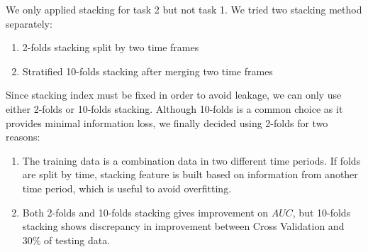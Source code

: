 \documentclass[a4paper]{llncs}
\begin{document}
%
%
%
%
%
%
%
%
%
%
%



We only applied stacking for task 2 but not task 1.
We tried two stacking method separately:
\begin{enumerate}
 \item 2-folds stacking split by two time frames

 \item Stratified 10-folds stacking after merging two time frames
\end{enumerate}

Since stacking index must be fixed in order to avoid leakage, we can only use either 2-folds or 10-folds stacking.
Although 10-folds is a common choice as it provides minimal information loss, we finally decided using 2-folds for two reasons:
\begin{enumerate}
 \item The training data is a combination data in two different time periods. If folds are split by time,
  stacking feature is built based on information from another time period, which is useful to avoid overfitting.

 \item Both 2-folds and 10-folds stacking gives improvement on $AUC$, but 10-folds stacking shows
  discrepancy in improvement between Cross Validation and 30\% of testing data.
\end{enumerate}
\end{document}
